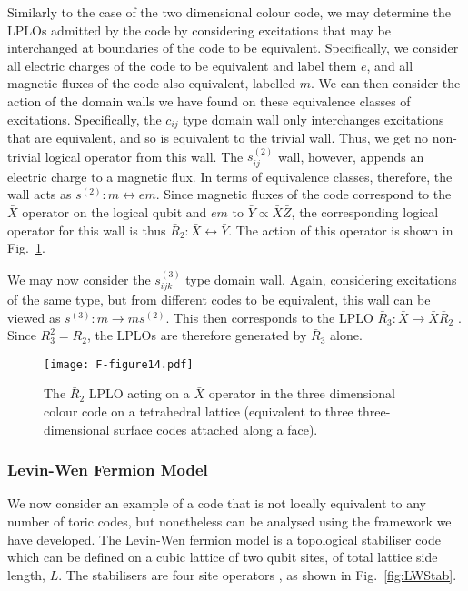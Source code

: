 \documentclass[pra,twocolumn,a4paper,nofootinbib]{revtex4-1}
\begin{document}
Similarly to the case of the two dimensional colour code, we may determine the LPLOs admitted by the code by considering excitations that may be interchanged at boundaries of the code to be equivalent. Specifically, we consider all electric charges of the code to be equivalent and label them $e$, and all magnetic fluxes of the code also equivalent, labelled $m$. We can then consider the action of the domain walls we have found on these equivalence classes of excitations. Specifically, the $c_{ij}$ type domain wall only interchanges excitations that are equivalent, and so is equivalent to the trivial wall. Thus, we get no non-trivial logical operator from this wall. The $s_{ij}^{(2)}$ wall, however, appends an electric charge to a magnetic flux. In terms of equivalence classes, therefore, the wall acts as $s^{(2)}: m \leftrightarrow em$. Since magnetic fluxes of the code correspond to the $\bar{X}$ operator on the logical qubit and $em$ to $\bar{Y} \propto \bar{X}\bar{Z}$, the corresponding logical operator for this wall is thus $\bar{R}_2: \bar{X} \leftrightarrow \bar{Y}$. The action of this operator is shown in Fig.~\ref{fig:3DR2}.

We may now consider the $s^{(3)}_{ijk}$ type domain wall. Again, considering excitations of the same type, but from different codes to be equivalent, this wall can be viewed as $s^{(3)}: m \to ms^{(2)}$. This then corresponds to the LPLO $\bar{R}_3: \bar{X} \to \bar{X}\bar{R}_2$ \cite{YoshidaA}. Since $R_3^2=R_2$, the LPLOs are therefore generated by $\bar{R}_3$ alone.

\begin{figure}
\centering
\texttt{[image: F-figure14.pdf]}
\caption{The $\bar{R}_2$ LPLO acting on a $\bar{X}$ operator in the three dimensional colour code on a tetrahedral lattice (equivalent to three three-dimensional surface codes attached along a face). \label{fig:3DR2}}
\end{figure}

\subsubsection{Levin-Wen Fermion Model}
\label{Sec:LW}
We now consider an example of a code that is not locally equivalent to any number of toric codes, but nonetheless can be analysed using the framework we have developed. The Levin-Wen fermion model \cite{LW} is a topological stabiliser code which can be defined on a cubic lattice of two qubit sites, of total lattice side length, $L$. The stabilisers are four site operators \cite{Haah}, as shown in Fig.~\ref{fig:LWStab}.
\end{document}
